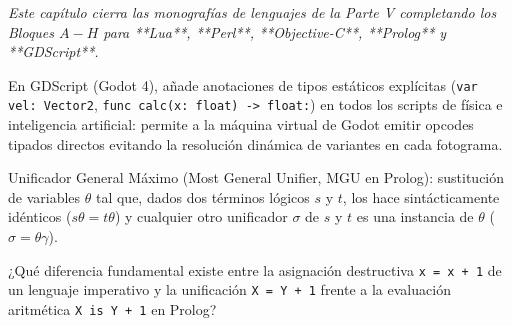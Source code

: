 \documentclass{book}
\begin{document}
\noindent\textit{Este capítulo cierra las monografías de lenguajes de la Parte V completando los Bloques \(A-H\) para **Lua**, **Perl**, **Objective-C**, **Prolog** y **GDScript**.}

\begin{tcolorbox}[title={Consejo}, studiumtip, breakable]

En GDScript (Godot 4), añade anotaciones de tipos estáticos explícitas (\texttt{var vel: Vector2}, \texttt{func calc(x: float) -> float:}) en todos los scripts de física e inteligencia artificial: permite a la máquina virtual de Godot emitir opcodes tipados directos evitando la resolución dinámica de variantes en cada fotograma.
\end{tcolorbox}

\begin{tcolorbox}[title={Definición}, studiumdef, breakable]

Unificador General Máximo (Most General Unifier, MGU en Prolog): sustitución de variables \(\theta\) tal que, dados dos términos lógicos \(s\) y \(t\), los hace sintácticamente idénticos (\(s\theta = t\theta\)) y cualquier otro unificador \(\sigma\) de \(s\) y \(t\) es una instancia de \(\theta\) (\(\sigma = \theta\gamma\)).
\end{tcolorbox}

\begin{tcolorbox}[title={Autoficha}, studiumcheck, breakable]

¿Qué diferencia fundamental existe entre la asignación destructiva \texttt{x = x + 1} de un lenguaje imperativo y la unificación \texttt{X = Y + 1} frente a la evaluación aritmética \texttt{X is Y + 1} en Prolog?
\end{tcolorbox}
\end{document}

